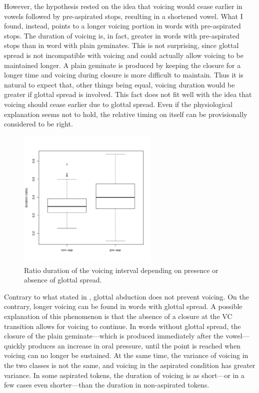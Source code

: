 \documentclass[11pt,a4paper,openany]{memoir}\usepackage[]{graphicx}\usepackage[]{color}
\newenvironment{knitrout}{}{} %
\begin{document}
However, the hypothesis rested on the idea that voicing would cease earlier in vowels followed by pre-aspirated stops, resulting in a shortened vowel.
What I found, instead, points to a longer voicing portion in words with pre-aspirated stops.
The duration of voicing is, in fact, greater in words with pre-aspirated stops than in word with plain geminates.
This is not surprising, since glottal spread is not incompatible with voicing and could actually allow voicing to be maintained longer.
A plain geminate is produced by keeping the closure for a longer time and voicing during closure is more difficult to maintain.
Thus it is natural to expect that, other things being equal, voicing duration would be greater if glottal spread is involved.
This fact does not fit well with the idea that voicing should cease earlier due to glottal spread.
Even if the physiological explanation seems not to hold, the relative timing on itself can be provisionally considered to be right.

\begin{figure}
\centering
\begin{knitrout}
\color{fgcolor}
\includegraphics[width=0.6\textwidth]{img/voic-stop-1} 

\end{knitrout}
\caption{Ratio duration of the voicing interval depending on presence or absence of glottal spread.}
\label{f:voicdur}
\end{figure}

Contrary to what stated in , glottal abduction does not prevent voicing.
On the contrary, longer voicing can be found in words with glottal spread.
A possible explanation of this phenomenon is that the absence of a closure at the VC transition allows for voicing to continue.
In words without glottal spread, the closure of the plain geminate---which is produced immediately after the vowel---quickly produces an increase in oral pressure, until the point is reached when voicing can no longer be sustained.
At the same time, the variance of voicing in the two classes is not the same, and voicing in the aspirated condition has greater variance.
In some aspirated tokens, the duration of voicing is as short---or in a few cases even shorter---than the duration in non-aspirated tokens.
\end{document}
